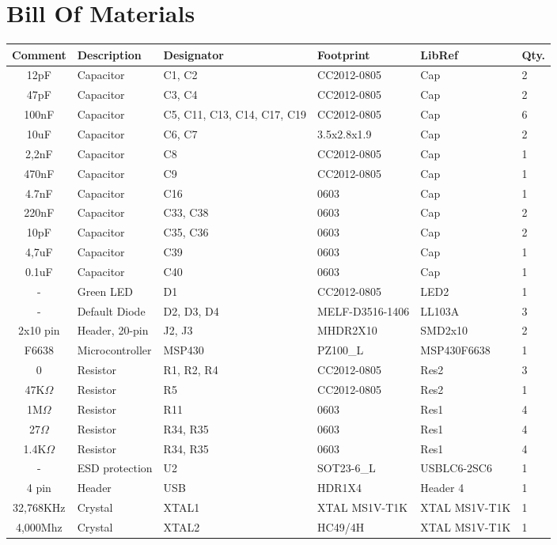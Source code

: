 \section{Bill Of Materials}
{\scriptsize
\begin{tabular}{| c |l | p{1.5cm} | l | l | l |} 
	\hline
		Comment & Description & Designator & Footprint & LibRef & Qty.\\ \hline
		12pF & Capacitor & C1, C2 & CC2012-0805 & Cap & 2\\ \hline
		47pF & Capacitor & C3, C4 & CC2012-0805 & Cap & 2\\ \hline
		100nF & Capacitor & C5, C11, C13, C14, C17, C19 & CC2012-0805 & Cap & 6\\ \hline
		10uF & Capacitor & C6, C7 & 3.5x2.8x1.9 & Cap & 2\\ \hline
		2,2nF & Capacitor & C8 & CC2012-0805 & Cap & 1\\ \hline
		470nF & Capacitor & C9 & CC2012-0805 & Cap & 1\\ \hline
		4.7nF & Capacitor & C16 & 0603 & Cap & 1\\ \hline
		220nF & Capacitor & C33, C38 & 0603 & Cap & 2\\ \hline
		10pF & Capacitor & C35, C36 & 0603 & Cap & 2\\ \hline
		4,7uF & Capacitor & C39 & 0603 & Cap & 1\\ \hline
		0.1uF & Capacitor & C40 & 0603 & Cap & 1\\ \hline
		- & Green LED & D1 & CC2012-0805 & LED2 & 1\\ \hline
		- & Default Diode & D2, D3, D4 & MELF-D3516-1406 &  LL103A & 3\\ \hline
		2x10 pin & Header, 20-pin & J2, J3 & MHDR2X10 & SMD2x10 & 2\\ \hline
		F6638 & Microcontroller & MSP430 & PZ100\_L & MSP430F6638 & 1\\ \hline
		0 & Resistor & R1, R2, R4 & CC2012-0805 & Res2 & 3\\ \hline
		47K$\Omega$ & Resistor & R5 & CC2012-0805 & Res2 & 1\\ \hline
		1M$\Omega$ & Resistor & R11 & 0603 & Res1 & 4\\ \hline
		27$\Omega$ & Resistor & R34, R35 & 0603 & Res1 & 4\\ \hline
		1.4K$\Omega$ & Resistor & R34, R35 & 0603 & Res1 & 4\\ \hline
		- & ESD protection & U2 & SOT23-6\_L & USBLC6-2SC6 & 1\\ \hline
		4 pin & Header & USB & HDR1X4 & Header 4 & 1\\ \hline
		32,768KHz & Crystal & XTAL1 & XTAL MS1V-T1K & XTAL MS1V-T1K & 1\\ \hline
		4,000Mhz & Crystal	& XTAL2 & HC49/4H & XTAL MS1V-T1K & 1\\ \hline
\end{tabular}\\\\
}

